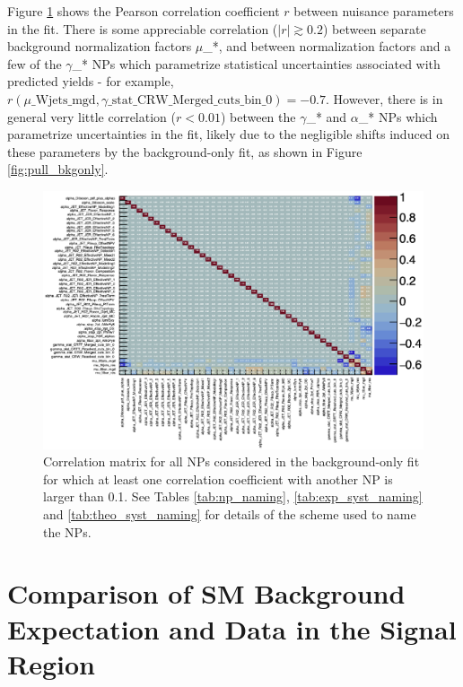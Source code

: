 Figure \ref{fig:corrs_bkgonly} shows the Pearson correlation coefficient \(r\) between nuisance parameters in the fit. There is some appreciable correlation (\(|r|\gtrsim0.2\)) between separate background normalization factors \(\mu\)\_*, and between normalization factors and a few of the \(\gamma\)\_* NPs which parametrize statistical uncertainties associated with predicted yields - for example, \(r(\mu\_\text{Wjets\_mgd}, \gamma\_\text{stat\_CRW\_Merged\_cuts\_bin\_0})=-0.7\). However, there is in general very little correlation (\(r<0.01\)) between the \(\gamma\)\_* and \(\alpha\)\_* NPs which parametrize uncertainties in the fit, likely due to the negligible shifts induced on these parameters by the background-only fit, as shown in Figure \ref{fig:pull_bkgonly}.

\begin{figure}[h]
  \centering
  \includegraphics[width=\textwidth]{Figures/8/BkgOnly/c_corrMatrix_RooExpandedFitResult_afterFit_edited.pdf}
  \caption[Pull plots for background-only fit]{\footnotesize{Correlation matrix for all NPs considered in the background-only fit for which at least one correlation coefficient with another NP is larger than 0.1. See Tables \ref{tab:np_naming}, \ref{tab:exp_syst_naming} and \ref{tab:theo_syst_naming} for details of the scheme used to name the NPs.}}
  \label{fig:corrs_bkgonly}
\end{figure}

\section{Comparison of SM Background Expectation and Data in the Signal Region}


